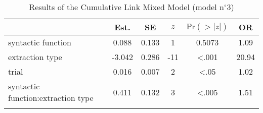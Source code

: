 \begin{table}
\begin{tabular}{l S[table-format=-1.3] S[table-format=1.3] S[table-format=-2.0] S[table-format=<1.4] S[table-format=2.2]}
  \lsptoprule
 & {Est.} & {SE} & {$z$} & {$\text{Pr}(>|z|)$} & {OR} \\ 
  \midrule
  syntactic function & 0.088 & 0.133 & 1 & 0.5073 & 1.09 \\ 
  extraction type & -3.042 & 0.286 & -11 & <.001 & 20.94 \\ 
  trial & 0.016 & 0.007 & 2 & <.05 & 1.02 \\ 
  syntactic function:extraction type & 0.411 & 0.132 & 3 & <.005 & 1.51 \\ 
   \lspbottomrule
\end{tabular}
\caption{Results of the Cumulative Link Mixed Model (model n$^{\circ}$3)}
\label{tab:exp12-m3}
\end{table}
